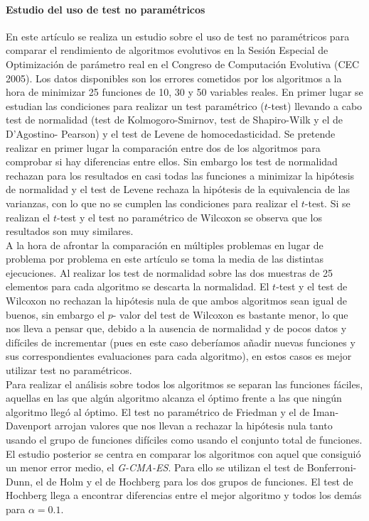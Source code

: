 	\paragraph{Estudio del uso de test no paramétricos} 
	\cite{DBLP:journals/heuristics/GarciaMLH09} En este artículo se realiza un estudio
sobre el uso de test no paramétricos para comparar el 
rendimiento de algoritmos evolutivos en la Sesión Especial de 
Optimización de parámetro real en el Congreso de Computación 
Evolutiva (CEC 2005). Los datos disponibles son los errores 
cometidos por los algoritmos a la hora de minimizar 25 
funciones de 10, 30 y 50 variables reales. En primer lugar se 
estudian las condiciones para realizar un test paramétrico 
($t$-test) llevando a cabo test de normalidad (test de 
Kolmogoro-Smirnov, test de Shapiro-Wilk y el de D'Agostino-
Pearson) y el test de Levene de homocedasticidad. Se 
pretende realizar en primer lugar la comparación entre dos de 
los algoritmos para comprobar si hay diferencias entre ellos. 
Sin embargo los test de normalidad rechazan para los 
resultados en casi todas las funciones a minimizar la 
hipótesis de normalidad y el test de Levene rechaza la 
hipótesis de la equivalencia de las varianzas, con lo que no 
se cumplen las condiciones para realizar el $t$-test. Si se 
realizan el $t$-test y el test no paramétrico de Wilcoxon se 
observa que los resultados son muy similares.\\
	A la hora de afrontar la comparación en múltiples 
problemas en lugar de problema por problema en este artículo 
se toma la media de las distintas ejecuciones. Al realizar 
los test de normalidad sobre las dos muestras de 25 elementos 
para cada algoritmo se descarta la normalidad. El $t$-test y 
el test de Wilcoxon no rechazan la hipótesis nula de que 
ambos algoritmos sean igual de buenos, sin embargo el $p$-
valor del test de Wilcoxon es bastante menor, lo que nos 
lleva a pensar que, debido a la ausencia de normalidad y de 
pocos datos y difíciles de incrementar (pues en este caso 
deberíamos añadir nuevas funciones y sus 
correspondientes evaluaciones para cada algoritmo), en estos 
casos es mejor utilizar test no paramétricos.\\
	Para realizar el análisis sobre todos los algoritmos se 
separan las funciones fáciles, aquellas en las que algún 
algoritmo alcanza el óptimo frente a las que ningún algoritmo 
llegó al óptimo. El test no paramétrico de Friedman y el de 
Iman-Davenport arrojan valores que nos llevan a rechazar la 
hipótesis nula tanto usando el grupo de funciones difíciles 
como usando el conjunto total de funciones.\\
	El estudio posterior se centra en comparar los algoritmos 
con aquel que consiguió un menor error medio, el 
\textit{G-CMA-ES}. Para ello se utilizan el test de 
Bonferroni-Dunn, el de Holm y el de Hochberg para los dos 
grupos de funciones. El test de Hochberg llega a encontrar 
diferencias entre el mejor algoritmo y todos los demás para 
$\alpha=0.1$. 
	
